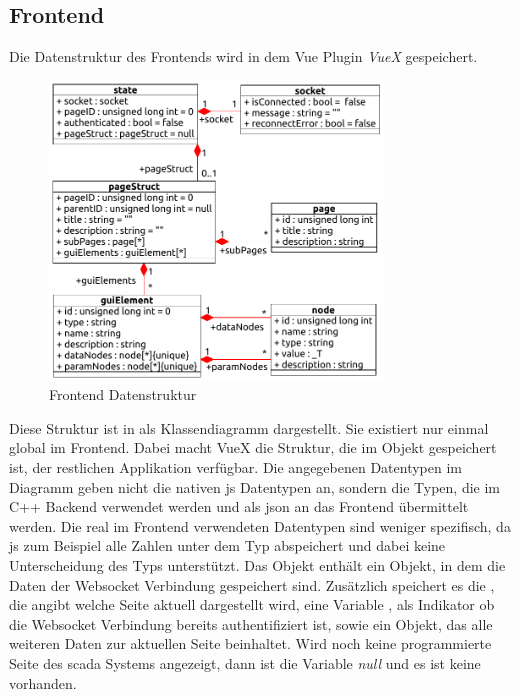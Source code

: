 \subsection{Frontend}\label{subsec:dataFrontend}
Die Datenstruktur des Frontends wird in dem Vue Plugin \emph{VueX} gespeichert.
\begin{figure}[H]
  \centering
  \includegraphics[width=0.79\textwidth]{content/hauptteil/systemEntwurf/res/structureFrontend.pdf}
  \caption[Frontend Datenstruktur]{Frontend Datenstruktur}
  \label{fig:structFrontendState}
\end{figure} 
Diese Struktur ist in  als Klassendiagramm dargestellt. Sie existiert nur einmal global im Frontend.
Dabei macht VueX die Struktur, die im  Objekt gespeichert ist, der restlichen Applikation verfügbar.
Die angegebenen Datentypen im Diagramm geben nicht die nativen \acl{js} Datentypen an, sondern die Typen, 
die im C++ Backend verwendet werden und als \ac{json} an das Frontend übermittelt werden.
Die real im Frontend verwendeten Datentypen sind weniger spezifisch, 
da \acl{js} zum Beispiel alle Zahlen unter dem Typ  abspeichert und dabei keine Unterscheidung des Typs unterstützt.
Das  Objekt enthält ein  Objekt, in dem die Daten der Websocket Verbindung gespeichert sind.
Zusätzlich speichert es die , die angibt welche Seite aktuell dargestellt wird, eine Variable , 
als Indikator ob die Websocket Verbindung bereits authentifiziert ist, sowie ein  Objekt, das alle weiteren Daten zur aktuellen Seite beinhaltet.
Wird noch keine programmierte Seite des \ac{scada} Systems angezeigt, dann ist die Variable  \emph{null} und es ist keine  vorhanden.
